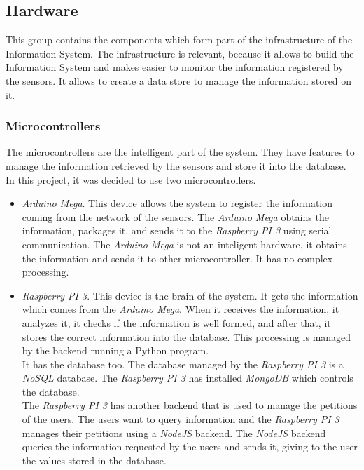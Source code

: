 \subsection{Hardware}

This group contains the components which form part of the infrastructure of the Information System. The infrastructure is relevant, because it allows to build the Information System and makes easier to monitor the information registered by the sensors. It allows to create a data store to manage the information stored on it.

\subsubsection{Microcontrollers}

The microcontrollers are the intelligent part of the system. They have features to manage the information retrieved by the sensors and store it into the database. In this project, it was decided to use two microcontrollers.

\begin{itemize}

\item \textit{Arduino Mega}. This device allows the system to register the information coming from the network of the sensors. The \textit{Arduino Mega} obtains the information, packages it, and sends it to the \textit{Raspberry PI 3} using serial communication. The \textit{Arduino Mega} is not an inteligent hardware, it obtains the information and sends it to other microcontroller. It has no complex processing.\\

\item \textit{Raspberry PI 3}. This device is the brain of the system. It gets the information which comes from the \textit{Arduino Mega}. When it receives the information, it analyzes it, it checks if the information is well formed, and after that, it stores the correct information into the database. This processing is managed by the backend running a Python program.\\

It has the database too. The database managed by the \textit{Raspberry PI 3} is a \textit{NoSQL} database. The \textit{Raspberry PI 3} has installed \textit{MongoDB} which controls the database.\\

The \textit{Raspberry PI 3} has another backend that is used to manage the petitions of the users. The users want to query information and the \textit{Raspberry PI 3} manages their petitions using a \textit{NodeJS} backend. The \textit{NodeJS} backend queries the information requested by the users and sends it, giving to the user the values stored in the database.

\end{itemize}

